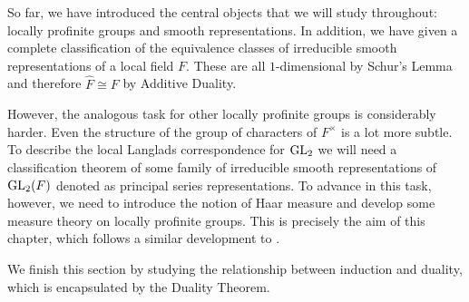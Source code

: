 So far, we have introduced the central objects that we will study throughout: locally profinite groups and smooth representations. In addition, we have given a complete classification of the equivalence classes of irreducible smooth representations of a local field $F$. These are all $1$-dimensional by Schur's Lemma and therefore $\hat{F}\cong F$ by Additive Duality. 

However, the analogous task for other locally profinite groups is considerably harder. Even the structure of the group of characters of $F^{\times}$ is a lot more subtle. To describe the local Langlads correspondence for $\mathrm{GL}_2$ we will need a classification theorem of some family of irreducible smooth representations of $\mathrm{GL}_2(F)$ denoted as principal series representations. To advance in this task, however, we need to introduce the notion of Haar measure and develop some measure theory on locally profinite groups. This is precisely the aim of this chapter, which follows a similar development to \cite[Chapter 3]{BH1}.

We finish this section by studying the relationship between induction and duality, which is encapsulated by the Duality Theorem.


\newpage